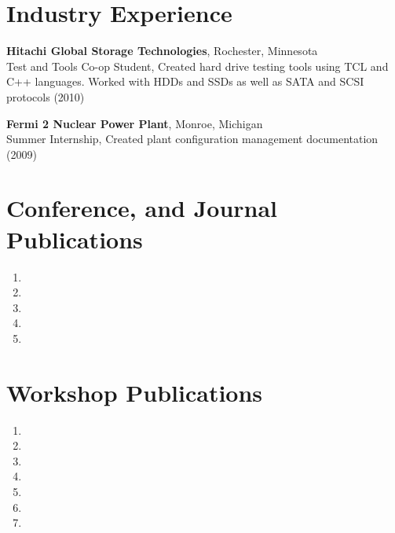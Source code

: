 \documentclass{article}
\begin{document}
\section*{Industry Experience}
\vspace{-6pt}

{\bf Hitachi Global Storage Technologies}, Rochester, Minnesota \\
Test and Tools Co-op Student, Created hard drive testing tools using TCL and
C++ languages. Worked with HDDs and SSDs as well as SATA and SCSI protocols (2010)

{\bf Fermi 2 Nuclear Power Plant}, Monroe, Michigan \\
Summer Internship, Created plant configuration management documentation (2009)


\section*{Conference, and Journal Publications}
\begin{enumerate}
  \item {}
  \item {}
  \item {}
  \item {}
  \item {}
\end{enumerate}

\section*{Workshop Publications}
\begin{enumerate}
  \item {}
  \item {}
  \item {}
  \item {}
  \item {}
  \item {}
  \item {}
\end{enumerate}
\end{document}

